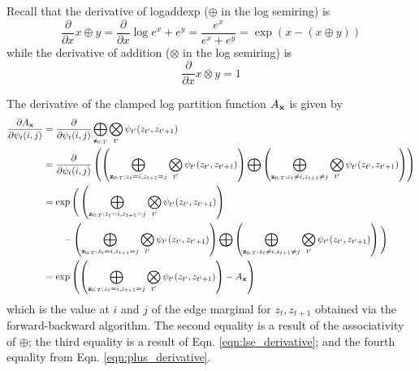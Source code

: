 \documentclass[12pt]{article}
\begin{document}
Recall that the derivative of logaddexp ($\oplus$ in the log semiring) is
\begin{equation}
\label{eqn:lse_derivative}
\frac{\partial}{\partial x} x \oplus y
= \frac{\partial}{\partial x} \log e^x + e^ y
= \frac{e^x}{e^x + e^y}
= \exp(x - (x \oplus y))
\end{equation}
while the derivative of addition ($\otimes$ in the log semiring) is
\begin{equation}
\label{eqn:plus_derivative}
\frac{\partial}{\partial x} x \otimes y = 1
\end{equation}

The derivative of the clamped log partition function $A_{\mathbf{x}}$ is given by
\begin{align*}
\frac{\partial A_{\mathbf{x}}}{\partial \psi_t(i,j)}
&= \frac{\partial}{\partial \psi_t(i,j)} \bigoplus_{\mathbf{z}_{0:T}}
    \bigotimes_{t'} \psi_{t'}(z_{t'}, z_{t'+1})\\
&= \frac{\partial}{\partial \psi_t(i,j)} \left(
        \left(\bigoplus_{\mathbf{z}_{0:T}:z_t = i, z_{t+1} = j}
        \bigotimes_{t'} \psi_{t'}(z_{t'}, z_{t'+1})\right)
        \bigoplus
        \left(\bigoplus_{\mathbf{z}_{0:T}:z_t \ne i, z_{t+1} \ne j}
        \bigotimes_{t'} \psi_{t'}(z_{t'}, z_{t'+1})\right)
    \right)\\
&= \exp\Bigg(\left(\bigoplus_{\mathbf{z}_{0:T}:z_t = i, z_{t+1} = j} 
    \bigotimes_{t'} \psi_{t'}(z_{t'}, z_{t'+1})\right)
    \\
&\qquad - \left(\bigoplus_{\mathbf{z}_{0:T}:z_t = i, z_{t+1} = j}
        \bigotimes_{t'} \psi_{t'}(z_{t'}, z_{t'+1})\right)
        \bigoplus
        \left(\bigoplus_{\mathbf{z}_{0:T}:z_t \ne i, z_{t+1} \ne j}
        \bigotimes_{t'} \psi_{t'}(z_{t'}, z_{t'+1})\right)
    \Bigg)\\
&= \exp\left(\left(\bigoplus_{\mathbf{z}_{0:T}:z_t = i, z_{t+1} = j} 
    \bigotimes_{t'} \psi_{t'}(z_{t'}, z_{t'+1})\right)
    - A_{\mathbf{x}}\right)
\end{align*} 
which is the value at $i$ and $j$ of the
edge marginal for $z_t, z_{t+1}$ obtained via the forward-backward algorithm.
The second equality is a result of the associativity of $\oplus$;
the third equality is a result of Eqn. \ref{eqn:lse_derivative};
and the fourth equality from Eqn. \ref{eqn:plus_derivative}.

\end{document}
